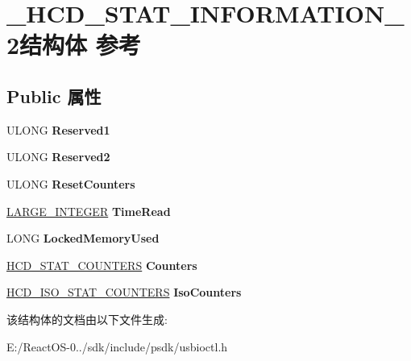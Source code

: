 \hypertarget{struct___h_c_d___s_t_a_t___i_n_f_o_r_m_a_t_i_o_n__2}{}\section{\+\_\+\+H\+C\+D\+\_\+\+S\+T\+A\+T\+\_\+\+I\+N\+F\+O\+R\+M\+A\+T\+I\+O\+N\+\_\+2结构体 参考}
\label{struct___h_c_d___s_t_a_t___i_n_f_o_r_m_a_t_i_o_n__2}
\subsection*{Public 属性}
\begin{DoxyCompactItemize}
\item 
\mbox{\label{struct___h_c_d___s_t_a_t___i_n_f_o_r_m_a_t_i_o_n__2_a0d0dd20b73252e58f023aadf551535bc}} 
U\+L\+O\+NG {\bfseries Reserved1}
\item 
\mbox{\label{struct___h_c_d___s_t_a_t___i_n_f_o_r_m_a_t_i_o_n__2_adc5276f681ba68c6e98d64fe39b65cac}} 
U\+L\+O\+NG {\bfseries Reserved2}
\item 
\mbox{\label{struct___h_c_d___s_t_a_t___i_n_f_o_r_m_a_t_i_o_n__2_a9f8e207eb084d61388f25f5c07abeb28}} 
U\+L\+O\+NG {\bfseries Reset\+Counters}
\item 
\mbox{\label{struct___h_c_d___s_t_a_t___i_n_f_o_r_m_a_t_i_o_n__2_a13d47f3e897f0f459daa90ffea147daf}} 
\hyperlink{union___l_a_r_g_e___i_n_t_e_g_e_r}{L\+A\+R\+G\+E\+\_\+\+I\+N\+T\+E\+G\+ER} {\bfseries Time\+Read}
\item 
\mbox{\label{struct___h_c_d___s_t_a_t___i_n_f_o_r_m_a_t_i_o_n__2_ab562f5a840e016541c2a30fbec601a0a}} 
L\+O\+NG {\bfseries Locked\+Memory\+Used}
\item 
\mbox{\label{struct___h_c_d___s_t_a_t___i_n_f_o_r_m_a_t_i_o_n__2_aae0c5f2ad522bce23efc70bbd10aa85f}} 
\hyperlink{struct___h_c_d___s_t_a_t___c_o_u_n_t_e_r_s}{H\+C\+D\+\_\+\+S\+T\+A\+T\+\_\+\+C\+O\+U\+N\+T\+E\+RS} {\bfseries Counters}
\item 
\mbox{\label{struct___h_c_d___s_t_a_t___i_n_f_o_r_m_a_t_i_o_n__2_a572a634365e9ac0e13b9e4fb02227269}} 
\hyperlink{struct___h_c_d___i_s_o___s_t_a_t___c_o_u_n_t_e_r_s}{H\+C\+D\+\_\+\+I\+S\+O\+\_\+\+S\+T\+A\+T\+\_\+\+C\+O\+U\+N\+T\+E\+RS} {\bfseries Iso\+Counters}
\end{DoxyCompactItemize}


该结构体的文档由以下文件生成\+:\begin{DoxyCompactItemize}
\item 
E\+:/\+React\+O\+S-\/0../sdk/include/psdk/usbioctl.\+h\end{DoxyCompactItemize}
